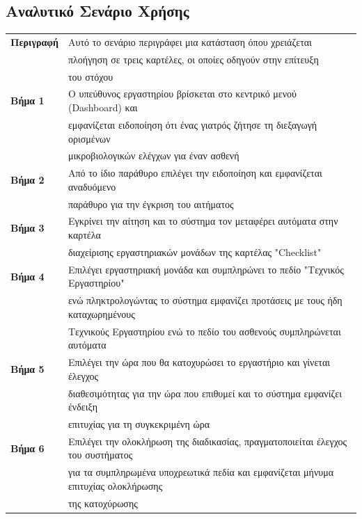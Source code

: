 \documentclass{article}
\newcommand\T{\rule{0pt}{2.6ex}}       %
\newcommand\B{\rule[-1.2ex]{0pt}{0pt}}
\begin{document}
  \subsection{Αναλυτικό Σενάριο Χρήσης}
 
  \begin{center}
     \begin{tabular}{|l|l|}
     \hline
      \textbf{Περιγραφή} & Αυτό το σενάριο περιγράφει μια κατάσταση όπου χρειάζεται \T \\& πλοήγηση σε τρεις καρτέλες, οι οποίες οδηγούν στην επίτευξη \\& του στόχου \B \\ 
      \hline
      \textbf{Βήμα 1} & Ο υπεύθυνος εργαστηρίου βρίσκεται στο κεντρικό μενού (Dashboard) και \T \\& εμφανίζεται ειδοποίηση ότι ένας γιατρός ζήτησε τη διεξαγωγή ορισμένων \\& μικροβιολογικών ελέγχων για έναν ασθενή\B \\
      \hline
      \textbf{Βήμα 2} & Από το ίδιο παράθυρο επιλέγει την ειδοποίηση και εμφανίζεται αναδυόμενο \T \\& παράθυρο για την έγκριση του αιτήματος\B\\
      \hline
      \textbf{Βήμα 3} & Εγκρίνει την αίτηση και το σύστημα τον μεταφέρει αυτόματα στην καρτέλα \T \\& διαχείρισης εργαστηριακών μονάδων της καρτέλας "Checklist"\B \\
      \hline
      \textbf{Βήμα 4} & Επιλέγει εργαστηριακή μονάδα και συμπληρώνει το πεδίο "Τεχνικός Εργαστηρίου"\T\\& ενώ πληκτρολογώντας το σύστημα εμφανίζει προτάσεις με τους ήδη καταχωρημένους \\& Τεχνικούς Εργαστηρίου ενώ το πεδίο του ασθενούς συμπληρώνεται αυτόματα  \B \\
      \hline
      \textbf{Βήμα 5} & Επιλέγει την ώρα που θα κατοχυρώσει το εργαστήριο και γίνεται έλεγχος \T\\& διαθεσιμότητας για την ώρα που επιθυμεί και το σύστημα εμφανίζει ένδειξη \\& επιτυχίας για τη συγκεκριμένη ώρα\B\\
      \hline
      \textbf{Βήμα 6} & Επιλέγει την ολοκλήρωση της διαδικασίας, πραγματοποιείται έλεγχος του συστήματος \T \\& για τα συμπληρωμένα υποχρεωτικά πεδία και εμφανίζεται μήνυμα επιτυχίας ολοκλήρωσης \\& της κατοχύρωσης \B\\

\end{tabular}
\end{center}
\end{document}
